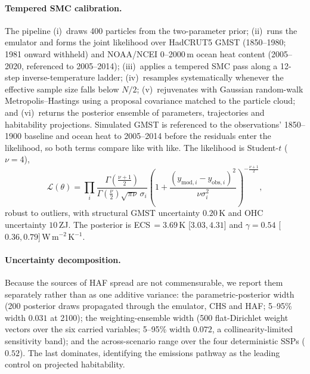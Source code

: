 \documentclass[10pt]{article}
\begin{document}
\paragraph*{Tempered SMC calibration.}
The pipeline (i)~draws 400 particles from the two-parameter prior; (ii)~runs the
emulator and forms the joint likelihood over HadCRUT5 GMST (1850--1980;
1981 onward withheld)\citep{Morice2021} and NOAA/NCEI 0--2000\,m ocean heat content
(2005--2020, referenced to 2005--2014)\citep{Levitus2012}; (iii)~applies a tempered
SMC pass\citep{DelMoral2006} along a 12-step inverse-temperature ladder;
(iv)~resamples systematically whenever the effective sample size falls below
$N/2$; (v)~rejuvenates with Gaussian random-walk Metropolis--Hastings using a
proposal covariance matched to the particle cloud; and (vi)~returns the posterior
ensemble of parameters, trajectories and habitability projections. Simulated GMST
is referenced to the observations' 1850--1900 baseline and ocean heat to
2005--2014 before the residuals enter the likelihood, so both terms compare like
with like. The likelihood is Student-$t$ ($\nu=4$),
\begin{equation}
\mathcal{L}(\theta)=\prod_i
\frac{\Gamma(\tfrac{\nu+1}{2})}{\Gamma(\tfrac{\nu}{2})\sqrt{\pi\nu}\,\sigma_i}
\left(1+\frac{(y_{\mathrm{mod},i}-y_{\mathrm{obs},i})^2}{\nu\sigma_i^2}\right)^{-\frac{\nu+1}{2}},
\label{eq:like}
\end{equation}
robust to outliers, with structural GMST uncertainty $0.20$\,K and OHC uncertainty
$10$\,ZJ. The posterior is ECS\,$=3.69$\,K [$3.03,4.31$] and $\gamma=0.54$
[$0.36,0.79$]\,W\,m$^{-2}$\,K$^{-1}$.

\paragraph*{Uncertainty decomposition.}
Because the sources of HAF spread are not commensurable, we report them
separately rather than as one additive variance: the parametric-posterior width
(200 posterior draws propagated through the emulator, CHS and HAF; 5--95\% width
$0.031$ at 2100); the weighting-ensemble width (500 flat-Dirichlet weight vectors
over the six carried variables; 5--95\% width $0.072$, a collinearity-limited
sensitivity band); and the across-scenario range over the four deterministic SSPs
($0.52$). The last dominates, identifying the emissions pathway as the leading
control on projected habitability.
\end{document}
